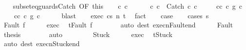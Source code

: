 \begin{isabellebody}
\ \ \isamarkupfalse%
\ subseteq{\isacharunderscore}guards{\isacharunderscore}Catch\ {\isacharbrackleft}OF\ this{\isacharbrackright}\isanewline
\ \ \isamarkupfalse%
\ c{}\ c{}\ \ \isanewline
\ \ \ \ c{\isacharcolon}\ {\isachardoublequoteopen}c\ {\isacharequal}\ Catch\ c{}\ c{}{\isachardoublequoteclose}\ \isanewline
\ \ \ \ c{}{\isacharunderscore}c{}{\isacharprime}{\isacharcolon}\ {\isachardoublequoteopen}c{}\ {\isasymsubseteq}\isactrlsub g\ c{}{\isacharprime}{\isachardoublequoteclose}\ \isanewline
\ \ \ \ c{}{\isacharunderscore}c{}{\isacharprime}{\isacharcolon}\ {\isachardoublequoteopen}c{}\ {\isasymsubseteq}\isactrlsub g\ c{}{\isacharprime}{\isachardoublequoteclose}\isanewline
\ \ \ \ \isamarkupfalse%
\ blast\isanewline
\ \ \isamarkupfalse%
\ exec{\isacharcolon}\ {\isachardoublequoteopen}{\isasymGamma}{\isasymturnstile}{\isasymlangle}c{\isacharcomma}s{\isasymrangle}\ {\isacharequal}n{\isasymRightarrow}\ t{\isachardoublequoteclose}\ \isamarkupfalse%
\ fact\isanewline
\ \ \isamarkupfalse%
\ {\isacharquery}case\isanewline
\ \ \isamarkupfalse%
\ {\isacharparenleft}cases\ {\isachardoublequoteopen}s{\isachardoublequoteclose}{\isacharparenright}\isanewline
\ \ \ \ \isamarkupfalse%
\ {\isacharparenleft}Fault\ f{\isacharparenright}\isanewline
\ \ \ \ \isamarkupfalse%
\ exec\ \isamarkupfalse%
\ {\isachardoublequoteopen}t{\isacharequal}Fault\ f{\isachardoublequoteclose}\isanewline
\ \ \ \ \ \ \isamarkupfalse%
\ {\isacharparenleft}auto\ dest{\isacharcolon}\ execn{\isacharunderscore}Fault{\isacharunderscore}end{\isacharparenright}\isanewline
\ \ \ \ \isamarkupfalse%
\ Fault\ \isamarkupfalse%
\ {\isacharquery}thesis\isanewline
\ \ \ \ \ \ \isamarkupfalse%
\ auto\isanewline
\ \ \isamarkupfalse%
\isanewline
\ \ \ \ \isamarkupfalse%
\ Stuck\isanewline
\ \ \ \ \isamarkupfalse%
\ exec\ \isamarkupfalse%
\ {\isachardoublequoteopen}t{\isacharequal}Stuck{\isachardoublequoteclose}\isanewline
\ \ \ \ \ \ \isamarkupfalse%
\ {\isacharparenleft}auto\ dest{\isacharcolon}\ execn{\isacharunderscore}Stuck{\isacharunderscore}end{\isacharparenright}\isanewline
\ \ \ \ \isamarkupfalse%

\end{isabellebody}
